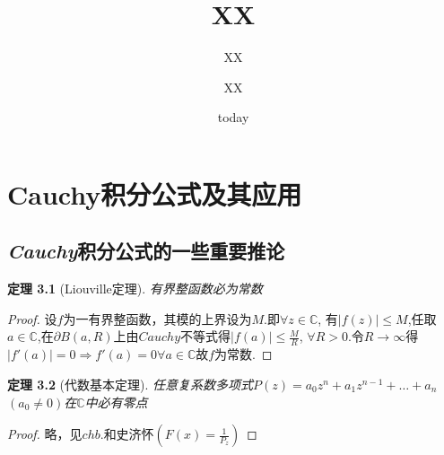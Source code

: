 \documentclass[b5paper,decoration]{qyxf-book}%
\title{XX}
\subtitle{XX}
\author{XX}
\date{today}
\newtheorem{mypro}{定理}[section]%
\begin{document}
\maketitle

\tableofcontents%

\chapter{}
\chapter{}
\chapter{{\rm Cauchy}积分公式及其应用}
\section{}
\section{}
\section{}
\section{}
\section{\emph{Cauchy}积分公式的一些重要推论}

\begin{mypro}[Liouville定理]
    有界整函数必为常数
\end{mypro}
\begin{proof}
    设$f$为一有界整函数，其模的上界设为$M$.即$\forall z\in\mathbb{C}$,
    有$|f(z)|\leq M$,任取$a\in\mathbb{C}$,在$\partial$$B(a,R)$上由$Cauchy$不等式得$\displaystyle{|f(a)|\le\frac{M}{R}}$,
    $\forall R>0$.令$R\rightarrow\infty$得$|f'(a)|=0\Rightarrow f'(a)=0\forall a\in\mathbb{C}$故$f$为常数.
\end{proof}

\begin{mypro}[代数基本定理]
    任意复系数多项式$P(z)=a_{0}z^{n}+a_{1}z^{n-1}+\dots+a_{n}$\quad$(a_{0}\neq0)$在$\mathbb{C}$中必有零点
\end{mypro}
\begin{proof}
    略，见$chb.$和史济怀\quad$\displaystyle{(F(x)=\frac{1}{P_{z}})}$
\end{proof}
\end{document}
